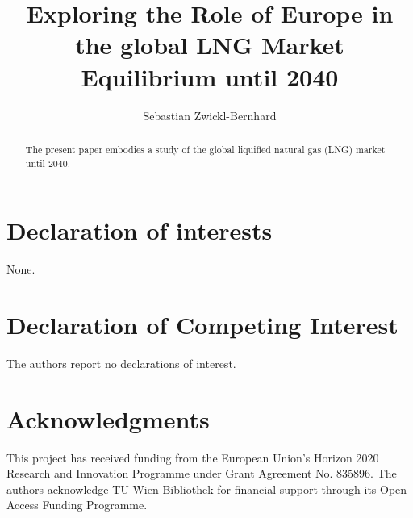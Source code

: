 \documentclass[review]{elsarticle}
\begin{document}
\begin{frontmatter}

\title{Exploring the Role of Europe in the global LNG Market Equilibrium until 2040}
\author[1,2]{Sebastian Zwickl-Bernhard}
\address[1]{Energy Economics Group (EEG), Technische Universität Wien, Gusshausstrasse 25-29/E370-3, 1040 Wien, Austria}
\address[2]{Department of Industrial Economics and Technology Management, \protect\\ The Norwegian University of Science and Technology, Trondheim, Norway}


\begin{abstract}
	The present paper embodies a study of the global liquified natural gas (LNG) market until 2040. 
\end{abstract}

\begin{keyword}	
\end{keyword}
\end{frontmatter}
\newpage

%
%
%
%

\section*{Declaration of interests}
None.
\section*{Declaration of Competing Interest}
The authors report no declarations of interest.
\section*{Acknowledgments}
This project has received funding from the European Union's Horizon 2020 Research and Innovation Programme under Grant Agreement No. 835896. The authors acknowledge TU Wien Bibliothek for financial support through its Open Access Funding Programme.

\appendix
\setcounter{table}{0}
\setcounter{figure}{0}
\end{document}
